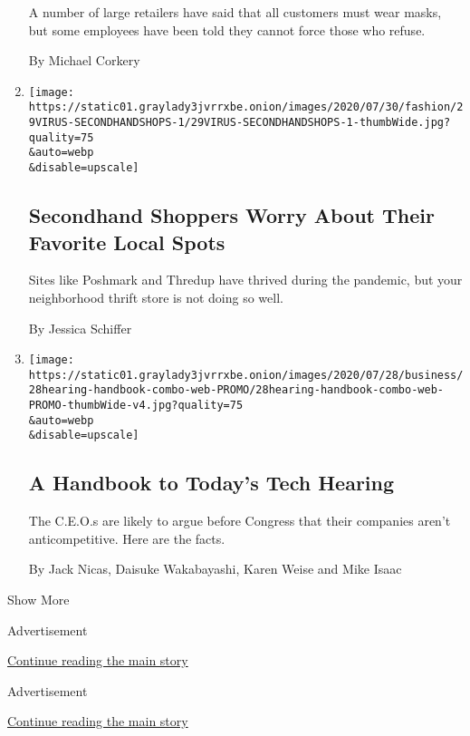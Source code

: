 \begin{enumerate}
  A number of large retailers have said that all customers must wear
  masks, but some employees have been told they cannot force those who
  refuse.

  By Michael Corkery
\item
  \href{/2020/07/29/style/secondhand-clothes-coronavirus-safety.html}{}

  \texttt{[image: https://static01.graylady3jvrrxbe.onion/images/2020/07/30/fashion/29VIRUS-SECONDHANDSHOPS-1/29VIRUS-SECONDHANDSHOPS-1-thumbWide.jpg?quality=75\\\&auto=webp\\\&disable=upscale]}

  \hypertarget{secondhand-shoppers-worry-about-their-favorite-local-spots}{%
  \subsection{Secondhand Shoppers Worry About Their Favorite Local
  Spots}\label{secondhand-shoppers-worry-about-their-favorite-local-spots}}

  Sites like Poshmark and Thredup have thrived during the pandemic, but
  your neighborhood thrift store is not doing so well.

  By Jessica Schiffer
\item
  \href{/2020/07/29/technology/tech-ceos-congress-what-to-know.html}{}

  \texttt{[image: https://static01.graylady3jvrrxbe.onion/images/2020/07/28/business/28hearing-handbook-combo-web-PROMO/28hearing-handbook-combo-web-PROMO-thumbWide-v4.jpg?quality=75\\\&auto=webp\\\&disable=upscale]}

  \hypertarget{a-handbook-to-todays-tech-hearing}{%
  \subsection{A Handbook to Today's Tech
  Hearing}\label{a-handbook-to-todays-tech-hearing}}

  The C.E.O.s are likely to argue before Congress that their companies
  aren't anticompetitive. Here are the facts.

  By Jack Nicas, Daisuke Wakabayashi, Karen Weise and Mike Isaac
\end{enumerate}

Show More

Advertisement

\protect\hyperlink{after-mid2}{Continue reading the main story}

Advertisement

\protect\hyperlink{after-mktg}{Continue reading the main story}

